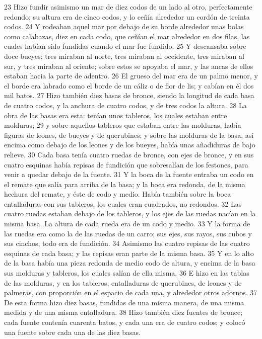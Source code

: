 23 Hizo fundir asimismo un mar de diez codos   de un lado al otro, perfectamente redondo; su altura era de cinco codos, y lo ceñía alrededor un cordón de treinta codos.
24 Y rodeaban aquel mar por debajo de su borde alrededor unas bolas como calabazas, diez en cada codo,  que ceñían el mar alrededor en dos filas, las cuales habían sido fundidas cuando el mar fue fundido.
25 Y descansaba sobre doce bueyes; tres miraban al norte, tres miraban al occidente, tres miraban al sur, y tres miraban al oriente; sobre estos se apoyaba el mar, y las ancas de ellos estaban hacia la parte de adentro.
26 El grueso del mar era de un palmo menor,  y el borde era labrado como el borde de un cáliz o de flor de lis; y cabían en él dos mil batos.
27 Hizo también diez basas de bronce, siendo la longitud de cada basa de cuatro codos,  y la anchura de cuatro codos, y de tres codos la altura.
28 La obra de las basas era esta: tenían unos tableros, los cuales estaban entre molduras;
29 y sobre aquellos tableros que estaban entre las molduras, había figuras de leones, de bueyes y de querubines; y sobre las molduras de la basa, así encima como debajo de los leones y de los bueyes, había unas añadiduras de bajo relieve.
30 Cada basa tenía cuatro ruedas de bronce, con ejes de bronce, y en sus cuatro esquinas había repisas de fundición que sobresalían de los festones, para venir a quedar debajo de la fuente.
31 Y la boca de la fuente entraba un codo   en el remate que salía para arriba de la basa; y la boca era redonda, de la misma hechura del remate, y éste de codo y medio. Había también sobre la boca entalladuras con sus tableros, los cuales eran cuadrados, no redondos.
32 Las cuatro ruedas estaban debajo de los tableros, y los ejes de las ruedas nacían en la misma basa. La altura de cada rueda era de un codo   y medio.
33 Y la forma de las ruedas era como la de las ruedas de un carro; sus ejes, sus rayos, sus cubos y sus cinchos, todo era de fundición.
34 Asimismo las cuatro repisas de las cuatro esquinas de cada basa; y las repisas eran parte de la misma basa.
35 Y en lo alto de la basa había una pieza redonda de medio codo   de altura, y encima de la basa sus molduras y tableros, los cuales salían de ella misma.
36 E hizo en las tablas de las molduras, y en los tableros, entalladuras de querubines, de leones y de palmeras, con proporción en el espacio de cada una, y alrededor otros adornos.
37 De esta forma hizo diez basas, fundidas de una misma manera, de una misma medida y de una misma entalladura.
38 Hizo también diez fuentes de bronce; cada fuente contenía cuarenta batos,  y cada una era de cuatro codos; y colocó una fuente sobre cada una de las diez basas.
